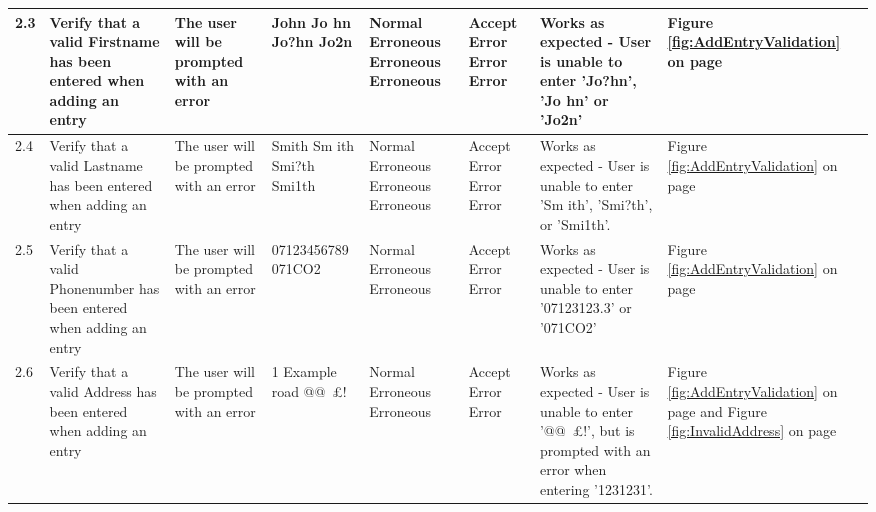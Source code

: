 \begin{landscape}
\begin{center}
\begin{longtable}{|p{1.5cm}|p{2cm}|p{2.5cm}|p{2.5cm}|p{2cm}|p{2cm}|p{2cm}|p{2cm}|}
        2.3 & Verify that a valid Firstname has been entered when adding an entry & The user will be prompted with an error & John \newline Jo hn \newline Jo?hn \newline Jo2n & Normal \newline Erroneous \newline Erroneous \newline Erroneous & Accept \newline Error \newline Error \newline Error & Works as expected - User is unable to enter 'Jo?hn', 'Jo hn' or 'Jo2n' & Figure \ref{fig:AddEntryValidation} on page \pageref{fig:AddEntryValidation} \\ \hline
        2.4 & Verify that a valid Lastname has been entered when adding an entry & The user will be prompted with an error & Smith \newline Sm ith \newline Smi?th \newline Smi1th & Normal \newline Erroneous \newline Erroneous \newline Erroneous & Accept \newline Error \newline Error \newline Error & Works as expected - User is unable to enter 'Sm ith', 'Smi?th', or 'Smi1th'. & Figure \ref{fig:AddEntryValidation} on page \pageref{fig:AddEntryValidation} \\ \hline
        2.5 & Verify that a valid Phonenumber has been entered when adding an entry & The user will be prompted with an error & 07123456789 \newline 07123123.3 \newline 071CO2 & Normal \newline Erroneous \newline Erroneous & Accept \newline Error \newline Error & Works as expected - User is unable to enter '07123123.3' or '071CO2' & Figure \ref{fig:AddEntryValidation} on page \pageref{fig:AddEntryValidation} \\ \hline
        2.6 & Verify that a valid Address has been entered when adding an entry & The user will be prompted with an error & 1 Example road \newline @@~£! \newline 1231231 & Normal \newline Erroneous \newline Erroneous & Accept \newline Error \newline Error & Works as expected - User is unable to enter '@@~£!', but is prompted with an error when entering '1231231'. & Figure \ref{fig:AddEntryValidation} on page \pageref{fig:AddEntryValidation} and Figure \ref{fig:InvalidAddress} on page \pageref{fig:InvalidAddress} \\ \hline

\end{longtable}
\end{center}
\end{landscape}
